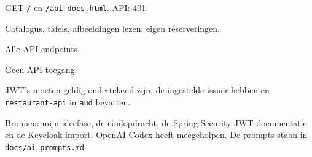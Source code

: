 \documentclass[11pt]{article}
\begin{document}
\begin{description}[style=nextline,leftmargin=3.2cm]
  \item[Niet ingelogd] GET \texttt{/} en \texttt{/api-docs.html}. API: 401.
  \item[CUSTOMER] Catalogus, tafels, afbeeldingen lezen; eigen reserveringen.
  \item[STAFF] Alle API-endpoints.
  \item[Onbekende rol] Geen API-toegang.
\end{description}

JWT's moeten geldig ondertekend zijn, de ingestelde issuer hebben en
\texttt{restaurant-api} in \texttt{aud} bevatten.

Bronnen: mijn ideefase, de eindopdracht, de Spring Security JWT-documentatie en
de Keycloak-import. OpenAI Codex heeft meegeholpen. De prompts staan in
\texttt{docs/ai-prompts.md}.
\end{document}
